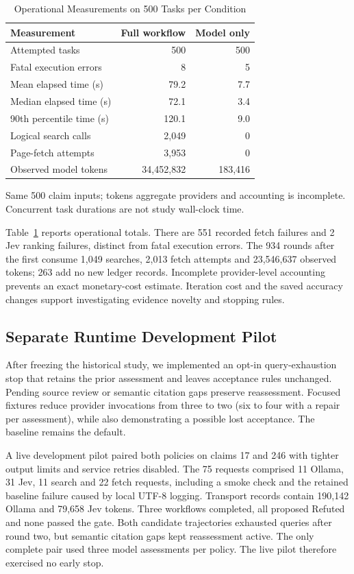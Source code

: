 \documentclass[conference]{IEEEtran}
\begin{document}
\begin{table}[t]
\caption{Operational Measurements on 500 Tasks per Condition}
\label{tab:cost}
\centering
\footnotesize
\begin{tabular}{@{}lrr@{}}
\toprule
Measurement & Full workflow & Model only\\
\midrule
Attempted tasks & 500 & 500\\
Fatal execution errors & 8 & 5\\
Mean elapsed time (s) & 79.2 & 7.7\\
Median elapsed time (s) & 72.1 & 3.4\\
90th percentile time (s) & 120.1 & 9.0\\
Logical search calls & 2,049 & 0\\
Page-fetch attempts & 3,953 & 0\\
Observed model tokens & 34,452,832 & 183,416\\
\bottomrule
\end{tabular}
\par\smallskip
\parbox{\columnwidth}{\footnotesize Same 500 claim inputs; tokens aggregate providers and accounting is incomplete. Concurrent task durations are not study wall-clock time.}
\end{table}

Table~\ref{tab:cost} reports operational totals. There are 551 recorded fetch failures and 2 Jev ranking failures, distinct from fatal execution errors. The 934 rounds after the first consume 1,049 searches, 2,013 fetch attempts and 23,546,637 observed tokens; 263 add no new ledger records. Incomplete provider-level accounting prevents an exact monetary-cost estimate. Iteration cost and the saved accuracy changes support investigating evidence novelty and stopping rules.

\subsection{Separate Runtime Development Pilot}
After freezing the historical study, we implemented an opt-in query-exhaustion stop that retains the prior assessment and leaves acceptance rules unchanged. Pending source review or semantic citation gaps preserve reassessment. Focused fixtures reduce provider invocations from three to two (six to four with a repair per assessment), while also demonstrating a possible lost acceptance. The baseline remains the default.

A live development pilot paired both policies on claims 17 and 246 with tighter output limits and service retries disabled. The 75 requests comprised 11 Ollama, 31 Jev, 11 search and 22 fetch requests, including a smoke check and the retained baseline failure caused by local UTF-8 logging. Transport records contain 190,142 Ollama and 79,658 Jev tokens. Three workflows completed, all proposed Refuted and none passed the gate. Both candidate trajectories exhausted queries after round two, but semantic citation gaps kept reassessment active. The only complete pair used three model assessments per policy. The live pilot therefore exercised no early stop.
\end{document}
